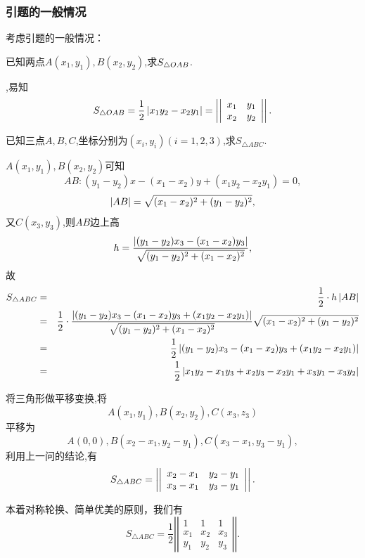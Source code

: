 \subsubsection{引题的一般情况}
考虑引题的一般情况：

\prob 已知两点$A(x_1,y_1),B(x_2,y_2)$,求$\displaystyle S_{\triangle OAB}$.

,易知
$$
S_{\triangle OAB}=\frac{1}{2}\left| {x_1y_2-x_2y_1} \right|
=\left| {\left| {\begin{array}{cc}
  x_1&y_1\\
  x_2&y_2\\ 
\end{array}} \right|} \right|.
$$
\solend

\prob 已知三点$A,B,C$,坐标分别为$(x_i,y_i)(i=1,2,3)$,求$S_{\triangle ABC}$.

$A(x_1,y_1),B(x_2,y_2)$可知
$$AB:(y_1-y_2)x-(x_1-x_2)y+(x_1y_2-x_2y_1)=0,$$
$$\left| {AB} \right|=\sqrt{(x_1-x_2)^2+(y_1-y_2)^2},$$
又$C(x_3,y_3)$,则$AB$边上高
$$h=\frac{\left| {(y_1-y_2)x_3-(x_1-x_2)y_3} \right|}
{\sqrt{(y_1-y_2)^2+(x_1-x_2)^2}},$$
故
\begin{eqnarray}
  S_{\triangle ABC}&=&\frac{1}{2}\cdot h \left| {AB} \right|\nonumber\\
  &=&\frac{1}{2}\cdot \frac{\left| {(y_1-y_2)x_3-(x_1-x_2)y_3+(x_1y_2-x_2y_1)} \right|}
    {\sqrt{(y_1-y_2)^2+(x_1-x_2)^2}}
    \sqrt{(x_1-x_2)^2+(y_1-y_2)^2}\nonumber\\
  &=&\frac{1}{2}\left| {(y_1-y_2)x_3-(x_1-x_2)y_3+(x_1y_2-x_2y_1)} \right|\nonumber\\
  &=&\frac{1}{2}\left| {x_1y_2-x_1y_3+x_2y_3-x_2y_1+x_3y_1-x_3y_2} \right|\nonumber
\end{eqnarray}
\solend

\sol 将三角形做平移变换,将
$$ A(x_1,y_1),B(x_2,y_2),C(x_3,z_3)$$
平移为
$$A(0,0),B(x_2-x_1,y_2-y_1),C(x_3-x_1,y_3-y_1),$$
利用上一问的结论,有
$$S_{\triangle ABC}=
\left| {\left| {\begin{array}{cc}
  x_2-x_1&y_2-y_1\\
  x_3-x_1&y_3-y_1\\ 
\end{array}} \right|} \right|.
$$
\solend

本着对称轮换、简单优美的原则，我们有$$S_{\triangle ABC}=
\frac{1}{2}\left|\left|\begin{array}{ccc}
    1 & 1 & 1 \\
    x_1 & x_2 & x_3 \\  
    y_1 & y_2 & y_3 
  \end{array}\right|\right|.
$$

